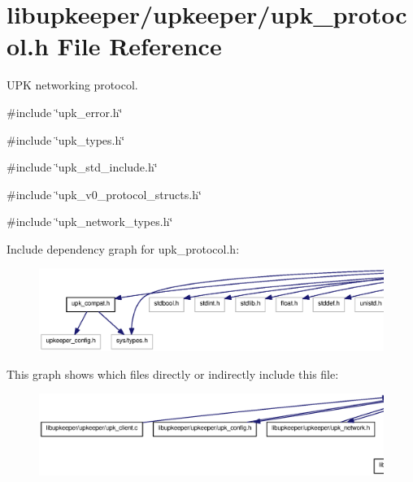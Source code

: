 \section{libupkeeper/upkeeper/upk\_\-protocol.h File Reference}
\label{upk__protocol_8h}


UPK networking protocol.  


{\ttfamily \#include \char`\"{}upk\_\-error.h\char`\"{}}\par
{\ttfamily \#include \char`\"{}upk\_\-types.h\char`\"{}}\par
{\ttfamily \#include \char`\"{}upk\_\-std\_\-include.h\char`\"{}}\par
{\ttfamily \#include \char`\"{}upk\_\-v0\_\-protocol\_\-structs.h\char`\"{}}\par
{\ttfamily \#include \char`\"{}upk\_\-network\_\-types.h\char`\"{}}\par
Include dependency graph for upk\_\-protocol.h:
\nopagebreak
\begin{figure}[H]
\begin{center}
\leavevmode
\includegraphics[width=400pt]{upk__protocol_8h__incl}
\end{center}
\end{figure}
This graph shows which files directly or indirectly include this file:\nopagebreak
\begin{figure}[H]
\begin{center}
\leavevmode
\includegraphics[width=400pt]{upk__protocol_8h__dep__incl}
\end{center}
\end{figure}

